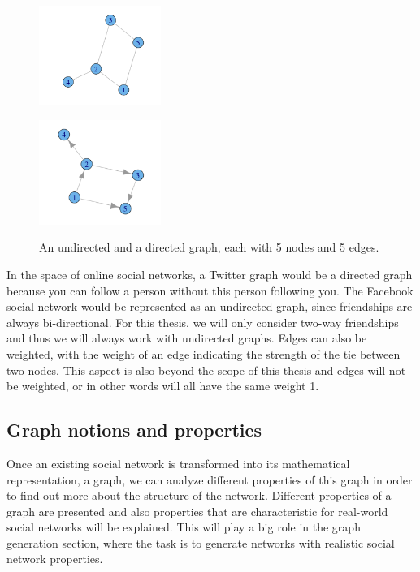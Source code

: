 \begin{figure}[!ht]
\centering
\begin{minipage}[b]{5 cm}
\includegraphics[width=150px]{./2-recommendersystemssocialnetworks/figures/SampleGraph.png}
\label{f:simplegraph}
\end{minipage}
\begin{minipage}[b]{5 cm}
\includegraphics[width=150px]{./2-recommendersystemssocialnetworks/figures/SampleGraph2.png}
\label{f:simplegraph}
\end{minipage}
\caption[An undirected and a directed graph, each with 5 nodes and 5 edges.]
{An undirected and a directed graph, each with 5 nodes and 5 edges.}
\end{figure}

In the space of online social networks, a Twitter graph would be a directed graph because you can follow a person without this person following you. The Facebook social network would be represented as an undirected graph, since friendships are always bi-directional. For this thesis, we will only consider two-way friendships and thus we will always work with undirected graphs. Edges can also be weighted, with the weight of an edge indicating the strength of the tie between two nodes. This aspect is also beyond the scope of this thesis and edges will not be weighted, or in other words will all have the same weight 1.

\subsection{Graph notions and properties}
\label{sst:graphproperties} Once an existing social network is transformed into its mathematical representation, a graph, we can analyze different properties of this graph in order to find out more about the structure of the network. Different properties of a graph are presented and also properties that are characteristic for real-world social networks will be explained. This will play a big role in the graph generation section, where the task is to generate networks with realistic social network properties.

